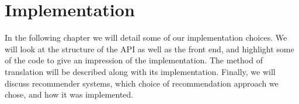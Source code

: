 \chapter{Implementation}
In the following chapter we will detail some of our implementation choices.
We will look at the structure of the API as well as the front end, and highlight some of the code to give an impression of the implementation.
The method of translation will be described along with its implementation.
Finally, we will discuss recommender systems, which choice of recommendation approach we chose, and how it was implemented.






